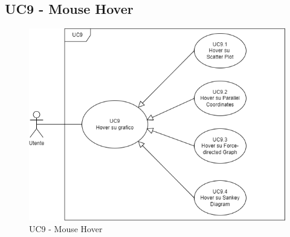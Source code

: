 \subsection{UC9 - Mouse Hover}
\label{sec:UC9}
\begin{figure}[h!]
    \centering
    \includegraphics[scale=0.60]{../../assets/UC9-MouseHover.png}
    \caption{UC9 - Mouse Hover}
\end{figure}
